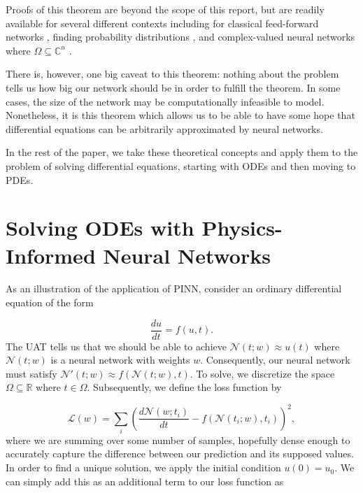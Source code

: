 \documentclass{CUP-JNL-DTM}%
\theoremstyle{definition}
\numberwithin{equation}{section}
\newcommand{\loss}{\mathcal{L}}
\newcommand{\net}{\mathcal{N}}
\begin{document}
\noindent Proofs of this theorem are beyond the scope of this report, but are readily available for several different contexts including for classical feed-forward networks \cite{hornikMultilayerFeedforwardNetworks1989, hornikApproximationCapabilitiesMultilayer1991}, finding probability distributions \cite{luUniversalApproximationTheorem2020}, and complex-valued neural networks where $\Omega \subseteq \mathbb{C}^n$ \cite{voigtlaenderUniversalApproximationTheorem2020}. 

There is, however, one big caveat to this theorem: nothing about the problem tells us how big our network should be in order to fulfill the theorem. In some cases, the size of the network may be computationally infeasible to model. Nonetheless, it is this theorem which allows us to be able to have some hope that differential equations can be arbitrarily approximated by neural networks. 

In the rest of the paper, we take these theoretical concepts and apply them to the problem of solving differential equations, starting with ODEs and then moving to PDEs. 



\section{Solving ODEs with Physics-Informed Neural Networks}
\label{sec:ODE}

As an illustration of the application of PINN, consider an ordinary differential equation of the form 

\begin{equation}
	\frac{du}{dt} = f(u,t). 
\end{equation}
The UAT tells us that we should be able to achieve $\net(t;w) \approx u(t)$ where $\net(t;w)$ is a neural network with weights $w$. Consequently, our neural network must satisfy $\net'(t;w) \approx f(\net(t;w), t)$. To solve, we discretize the space $\Omega \subseteq \mathbb{R}$ where $t \in \Omega$. Subsequently, we define the loss function by 

\begin{equation}
	\loss(w) = \sum_i \left( \frac{d\net(w; t_i)}{dt} - f(\net(t_i;w), t_i)\right)^2, 
\end{equation}
where we are summing over some number of samples, hopefully dense enough to accurately capture the difference between our prediction and its supposed values. In order to find a unique solution, we apply the initial condition $u(0) = u_0$. We can simply add this as an additional term to our loss function as 
\end{document}
